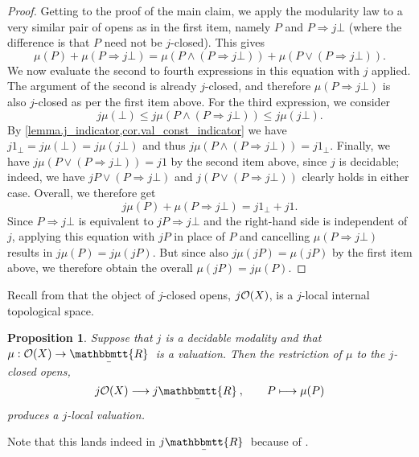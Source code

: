 \documentclass[11pt, oneside, article]{memoir}
\theoremstyle{plain}
\newtheorem{proposition}[theorem]{Proposition}
\theoremstyle{definition}
\theoremstyle{remark}
\newcommand{\ubar}[1]{\underaccent{\bar}{#1}}
\newcommand{\ind}[1]{1_{#1}}
\newcommand{\internal}[1]{\raisebox{-.03ex}{$\mathbbmtt{#1}$}}
\newcommand{\hs}{\hspace{1.1pt}}
\newcommand{\trr}{\internal{R}\hs}
\newcommand{\tlrr}{\ubar{\trr}\hs}
\newcommand{\Op}[1][undef]{\ifthenelse{\equal{#1}{undef}}{\mathcal{O}}{\mathcal{O}(#1)}}
\newcommand{\imp}{\Rightarrow}
\begin{document}
\begin{proof}
	Getting to the proof of the main claim, we apply the modularity law to a very similar pair of opens as in the first item, namely $P$ and $P \Rightarrow j\bot$ (where the difference is that $P$ need not be $j$-closed). This gives
	\[
		\mu(P) + \mu(P \Rightarrow j\bot) = \mu(P \land (P \Rightarrow j\bot)) + \mu(P \lor (P \Rightarrow j\bot)).
	\]
	We now evaluate the second to fourth expressions in this equation with $j$ applied. The argument of the second is already $j$-closed, and therefore $\mu(P \Rightarrow j\bot)$ is also $j$-closed as per the first item above. For the third expression, we consider
	\[
		j \mu(\bot) \le j \mu(P \land (P \Rightarrow j\bot)) \le j \mu(j\bot).
	\]
	By \cref{lemma.j_indicator,cor.val_const_indicator} we have $j \ind{\bot}=j \mu(\bot)=j\mu(j\bot)$ and thus $j \mu(P \land (P \Rightarrow j\bot)) =  j \ind{\bot}$. Finally, we have $j \mu(P \lor (P \Rightarrow j\bot)) = j 1$ by the second item above, since $j$ is decidable; indeed, we have $jP\vee(P\imp j\bot)$ and $j(P \lor (P \Rightarrow j\bot))$ clearly holds in either case. Overall, we therefore get
	\[
		j \mu(P) + \mu(P \Rightarrow j\bot) = j \ind{\bot} + j 1.
	\]
	Since $P \Rightarrow j\bot$ is equivalent to $jP \Rightarrow j\bot$ and the right-hand side is independent of $j$, applying this equation with $jP$ in place of $P$ and cancelling $\mu(P \Rightarrow j\bot)$ results in $j \mu(P) = j \mu(jP)$. But since also $j \mu(jP) = \mu(jP)$ by the first item above, we therefore obtain the overall $\mu(jP) = j \mu(P)$.
\end{proof}

Recall from  that the object of $j$-closed opens, $j \Op[X]$, is a $j$-local internal topological space.

\begin{proposition}
	\label{val_localize}
	Suppose that $j$ is a decidable modality and that $\mu : \Op[X] \to \tlrr$ is a valuation. Then the restriction of $\mu$ to the $j$-closed opens,
	\[
		j \Op[X] \longrightarrow j \tlrr, \qquad P \longmapsto \mu(P)
	\]
	produces a $j$-local valuation.
\end{proposition}

Note that this lands indeed in $j \tlrr$ because of .
\end{document}
